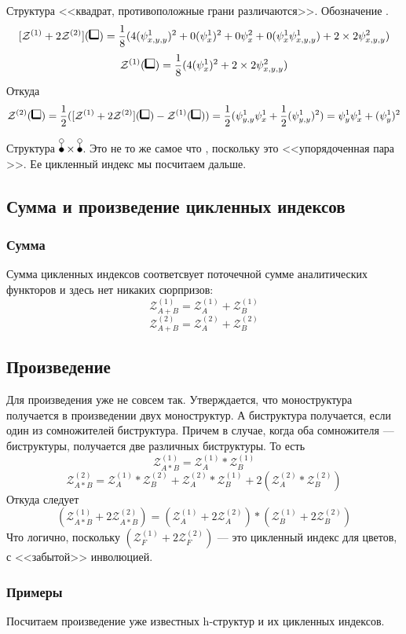 Структура <<квадрат, противоположные грани различаются>>. Обозначение \dBB.
$$
\Zfull(\dBB) = \frac{1}{8}(4(\psi_{x,y,y}^1)^2 + 0(\psi_{x}^1)^2 + 0\psi_{x}^2
+ 0(\psi_x^1\psi_{x,y,y}^1) + 2\times2\psi_{x,y,y}^2)
$$
$$
\mathcal Z^{(1)}(\dBB) = \frac{1}{8}(4(\psi_{x}^1)^2 + 2\times2\psi_{x,y,y}^2)
$$
Откуда
$$
\mathcal Z^{(2)}(\dBB) = \frac{1}{2}(\Zfull(\dBB) - \mathcal
Z^{(1)}(\dBB)) = \frac{1}{2}(\psi_{y,y}^1\psi_{x}^1 +
\frac{1}{2}(\psi_{y, y}^1)^2) = \psi_{y}^1\psi_{x}^1 + (\psi_{y}^1)^2 $$

Структура $\dB \times \dB$. Это не то же самое что \dBB, поскольку это <<упорядоченная пара \dB>>.
Ее цикленный индекс мы посчитаем дальше.

\subsection{Сумма и произведение цикленных индексов}
\subsubsection{Сумма}
Сумма цикленных индексов соответсвует поточечной сумме аналитических
функторов и здесь нет никаких сюрпризов:
$$
\mathcal Z_{A + B}^{(1)} = \mathcal Z_A^{(1)} + \mathcal Z_B^{(1)}
$$
$$
\mathcal Z_{A + B}^{(2)} = \mathcal Z_A^{(2)} + \mathcal Z_B^{(2)}
$$
\subsection{Произведение}
Для произведения уже не совсем так. Утверждается, что моноструктура получается
в произведении двух моноструктур. А биструктура получается, если один из
сомножителей биструктура. Причем в случае, когда оба сомножителя ---
биструктуры, получается две различных биструктуры. То есть
$$
\mathcal Z_{A * B}^{(1)} = \mathcal Z_A^{(1)} * \mathcal Z_B^{(1)}
$$
$$
\mathcal Z_{A * B}^{(2)} = 
\mathcal Z_A^{(1)} * \mathcal Z_B^{(2)} + 
\mathcal Z_A^{(2)} * \mathcal Z_B^{(1)} +
2 (\mathcal Z_A^{(2)} * \mathcal Z_B^{(2)})
$$
Откуда следует
$$
(\mathcal Z_{A * B}^{(1)} + 2\mathcal Z_{A * B}^{(2)}) = 
(\mathcal Z_A^{(1)} + 2\mathcal Z_A^{(2)}) * 
(\mathcal Z_B^{(1)} + 2\mathcal Z_B^{(2)})
 $$
Что логично, поскольку $(\mathcal Z_F^{(1)} + 2\mathcal Z_F^{(2)})$ --- это
цикленный индекс для цветов, с <<забытой>> инволюцией.

\subsubsection{Примеры}
Посчитаем произведение уже известных h-структур и их цикленных индексов.

